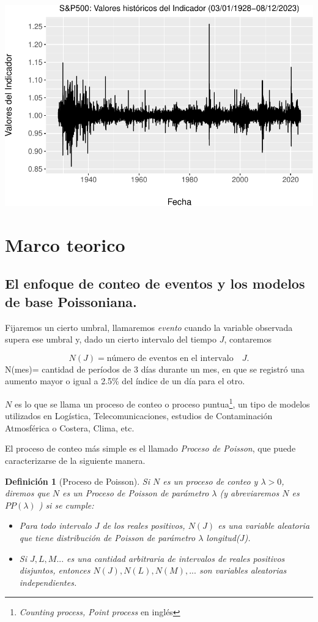 \documentclass[
  oneside]{article}
\newtheorem{definition}{Definición}[section]
\begin{document}
\includegraphics{Entrega_Laura_Montaldo_files/figure-latex/unnamed-chunk-13-1.pdf}

\newpage

\section{Marco teorico}
\subsection{El enfoque de conteo de eventos y los modelos de base Poissoniana.}

Fijaremos un cierto umbral, llamaremos \textit{evento} cuando la
variable observada supera ese umbral y, dado un cierto intervalo del
tiempo \(J\), contaremos

\[
N(J)= \text{número de eventos en el intervalo}\quad J.
\] N(mes)= cantidad de períodos de 3 días durante un mes, en que se
registró una aumento mayor o igual a 2.5\% del índice de un día para el
otro.

\(N\) es lo que se llama un proceso de conteo o proceso
puntua\footnote{\textit{Counting process, Point process} en inglés}, un
tipo de modelos utilizados en Logística, Telecomunicaciones, estudios de
Contaminación Atmosférica o Costera, Clima, etc.

El proceso de conteo más simple es el llamado
\textit{Proceso de Poisson}, que puede caracterizarse de la siguiente
manera.

\begin{definition}[Proceso de Poisson]\label{def:1}
Si $N$ es un proceso de conteo y $\lambda>0$, diremos que $N$ es un Proceso de Poisson de parámetro $\lambda$ (y abreviaremos $N$ es $PP(\lambda)$ ) si se cumple:
\begin{itemize}
\item[a)] Para todo intervalo $J$ de los reales positivos, $N(J)$ es una variable aleatoria que tiene distribución de Poisson de parámetro $\lambda$ longitud($J$).
\item[b)] Si $J, L, M...$ es una cantidad arbitraria de intervalos de reales positivos \textit{disjuntos}, entonces $N(J), N(L), N(M),...$ son variables aleatorias independientes.
\end{itemize}
\end{definition}
\end{document}
